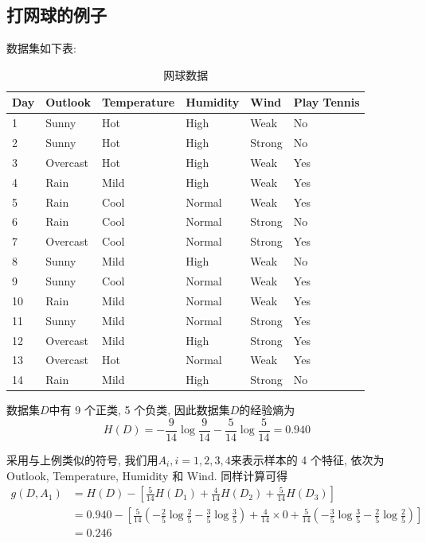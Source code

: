 \documentclass[a4paper,UTF8]{ctexart}
\theoremstyle{plain} \newtheorem{theorem}{定理}[section]
\theoremstyle{plain} \newtheorem{definition}{定义}[section]
\theoremstyle{plain} \newtheorem{lemma}{引理}[section]
\theoremstyle{plain} \newtheorem{proposition}{命题}[section]
\theoremstyle{plain} \newtheorem{example}{例}
\theoremstyle{plain} \newtheorem{remark}{注}
\theoremstyle{plain} \newtheorem{corollary}{推论}[section]
\begin{document}
\subsection{打网球的例子}
数据集如下表:
\begin{table}[!htb]
\centering
\caption{网球数据}
\label{tennis}
\begin{tabular}{l|l|l|l|l|l}
  \hline
    \textbf{Day} & \textbf{Outlook} & \textbf{Temperature} & \textbf{Humidity} & \textbf{Wind} & \textbf{Play Tennis} \\
    \hline
    1 & Sunny & Hot & High & Weak & No \\ 
    \hline
    2 & Sunny & Hot & High & Strong  & No \\ 
    \hline
    3 & Overcast & Hot & High & Weak & Yes \\ 
    \hline 
    4 & Rain & Mild & High & Weak & Yes \\ 
    \hline
    5 & Rain & Cool & Normal & Weak & Yes \\ 
    \hline
    6 & Rain & Cool & Normal & Strong &  No \\ 
    \hline
    7 & Overcast & Cool & Normal & Strong & Yes \\ 
    \hline
    8 & Sunny & Mild & High & Weak & No \\ 
    \hline
    9 & Sunny & Cool & Normal & Weak & Yes \\ 
    \hline
    10 & Rain & Mild & Normal & Weak & Yes \\ 
    \hline
    11 & Sunny & Mild & Normal & Strong & Yes \\ 
    \hline
    12 & Overcast & Mild & High & Strong & Yes \\ 
    \hline
    13 & Overcast & Hot & Normal & Weak & Yes \\
    \hline
    14 & Rain & Mild & High & Strong & No \\ 
  \hline
\end{tabular}
\end{table}

数据集$D$中有 9 个正类, 5 个负类, 因此数据集$D$的经验熵为
\begin{equation*}
H(D) = - \frac{9}{14} \log \frac{9}{14} - \frac{5}{14} \log \frac{5}{14} = 0.940
\end{equation*}

采用与上例类似的符号, 我们用$A_{i}, i = 1,2,3,4$来表示样本的 4 个特征, 依次为 Outlook, Temperature, Humidity 和 Wind. 同样计算可得
\begin{align*}
g(D, A_{1}) & = H(D) - \left[ \frac{5}{14} H(D_{1}) + \frac{4}{14} H(D_{2}) + \frac{5}{14} H(D_{3}) \right] \\ 
& = 0.940 - \left[ \frac{5}{14} \left( - \frac{2}{5} \log \frac{2}{5} - \frac{3}{5} \log \frac{3}{5} \right) + \frac{4}{14} \times 0 + \frac{5}{14} \left( - \frac{3}{5} \log \frac{3}{5} - \frac{2}{5} \log \frac{2}{5} \right) \right] \\ 
& = 0.246
\end{align*}
\end{document}
